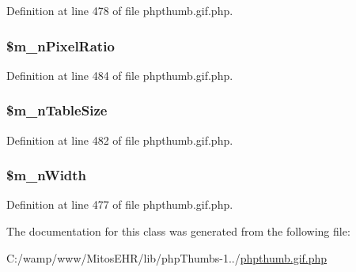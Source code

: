 \-Definition at line 478 of file phpthumb.\-gif.\-php.

\hypertarget{class_c_g_i_f_f_i_l_e_h_e_a_d_e_r_a4c6a36422a5a0fb21cf07012219f49af}{
\subsubsection[{\$m\-\_\-n\-Pixel\-Ratio}]{\setlength{\rightskip}{0pt plus 5cm}\$m\-\_\-n\-Pixel\-Ratio}}\label{class_c_g_i_f_f_i_l_e_h_e_a_d_e_r_a4c6a36422a5a0fb21cf07012219f49af}


\-Definition at line 484 of file phpthumb.\-gif.\-php.

\hypertarget{class_c_g_i_f_f_i_l_e_h_e_a_d_e_r_a6d37a6f1fbdab74c9cf95a77ee5fe6ca}{
\subsubsection[{\$m\-\_\-n\-Table\-Size}]{\setlength{\rightskip}{0pt plus 5cm}\$m\-\_\-n\-Table\-Size}}\label{class_c_g_i_f_f_i_l_e_h_e_a_d_e_r_a6d37a6f1fbdab74c9cf95a77ee5fe6ca}


\-Definition at line 482 of file phpthumb.\-gif.\-php.

\hypertarget{class_c_g_i_f_f_i_l_e_h_e_a_d_e_r_ad30af53763e84b5b9bec01595ccf9598}{
\subsubsection[{\$m\-\_\-n\-Width}]{\setlength{\rightskip}{0pt plus 5cm}\$m\-\_\-n\-Width}}\label{class_c_g_i_f_f_i_l_e_h_e_a_d_e_r_ad30af53763e84b5b9bec01595ccf9598}


\-Definition at line 477 of file phpthumb.\-gif.\-php.



\-The documentation for this class was generated from the following file\-:\begin{DoxyCompactItemize}
\item 
\-C\-:/wamp/www/\-Mitos\-E\-H\-R/lib/php\-Thumbs-\/1../\hyperlink{phpthumb_8gif_8php}{phpthumb.\-gif.\-php}\end{DoxyCompactItemize}
